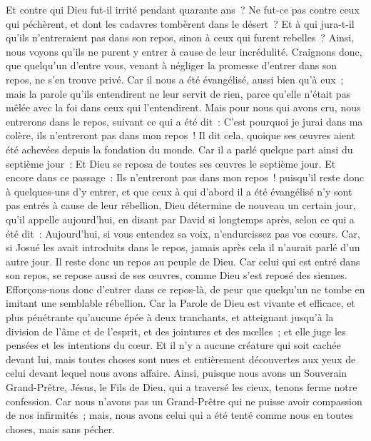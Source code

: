 \begin{multicols}{2}
Et contre qui Dieu fut-il irrité pendant quarante ans~? Ne fut-ce pas contre ceux qui péchèrent, et dont les cadavres tombèrent dans le désert~?
Et à qui jura-t-il qu'ils n'entreraient pas dans son repos, sinon à ceux qui furent rebelles~?
Ainsi, nous voyons qu'ils ne purent y entrer à cause de leur incrédulité.
\VerseOne{}Craignons donc, que quelqu'un d'entre vous, venant à négliger la promesse d'entrer dans son repos, ne s'en trouve privé.
Car il nous a été évangélisé, aussi bien qu'à eux~; mais la parole qu'ils entendirent ne leur servit de rien, parce qu'elle n'était pas mêlée avec la foi dans ceux qui l'entendirent.
Mais pour nous qui avons cru, nous entrerons dans le repos, suivant ce qui a été dit~: C'est pourquoi je jurai dans ma colère, ils n'entreront pas dans mon repos~! Il dit cela, quoique ses œuvres aient été achevées depuis la fondation du monde.
Car il a parlé quelque part ainsi du septième jour~: Et Dieu se reposa de toutes ses œuvres le septième jour.
Et encore dans ce passage~: Ils n'entreront pas dans mon repos~!
puisqu'il reste donc à quelques-uns d'y entrer, et que ceux à qui d'abord il a été évangélisé n'y sont pas entrés à cause de leur rébellion,
Dieu détermine de nouveau un certain jour, qu'il appelle aujourd'hui, en disant par David si longtemps après, selon ce qui a été dit~: Aujourd'hui, si vous entendez sa voix, n'endurcissez pas vos cœurs.
Car, si Josué les avait introduits dans le repos, jamais après cela il n'aurait parlé d'un autre jour.
Il reste donc un repos au peuple de Dieu.
Car celui qui est entré dans son repos, se repose aussi de ses œuvres, comme Dieu s'est reposé des siennes.
Efforçons-nous donc d'entrer dans ce repos-là, de peur que quelqu'un ne tombe en imitant une semblable rébellion.
Car la Parole de Dieu est vivante et efficace, et plus pénétrante qu'aucune épée à deux tranchants, et atteignant jusqu'à la division de l'âme et de l'esprit, et des jointures et des mœlles~; et elle juge les pensées et les intentions du cœur.
Et il n'y a aucune créature qui soit cachée devant lui, mais toutes choses sont nues et entièrement découvertes aux yeux de celui devant lequel nous avons affaire.
Ainsi, puisque nous avons un Souverain Grand-Prêtre, Jésus, le Fils de Dieu, qui a traversé les cieux, tenons ferme notre confession.
Car nous n'avons pas un Grand-Prêtre qui ne puisse avoir compassion de nos infirmités~; mais, nous avons celui qui a été tenté comme nous en toutes choses, mais sans pécher.

\end{multicols}
